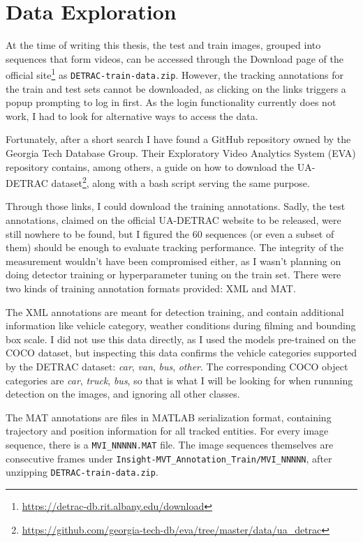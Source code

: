 \section{Data Exploration}

At the time of writing this thesis, the test and train images, grouped into sequences that form videos, can be accessed through the Download page of the official site\footnote{\url{https://detrac-db.rit.albany.edu/download}} as \verb|DETRAC-train-data.zip|. However, the tracking annotations for the train and test sets cannot be downloaded, as clicking on the links triggers a popup prompting to log in first. As the login functionality currently does not work, I had to look for alternative ways to access the data.  

Fortunately, after a short search I have found a GitHub repository owned by the Georgia Tech Database Group. Their Exploratory Video Analytics System (EVA) repository contains, among others, a guide on how to download the UA-DETRAC dataset\footnote{\url{https://github.com/georgia-tech-db/eva/tree/master/data/ua_detrac}}, along with a bash script serving the same purpose.

Through those links, I could download the training annotations. Sadly, the test annotations, claimed on the official UA-DETRAC website to be released, were still nowhere to be found, but I figured the 60 sequences (or even a subset of them) should be enough to evaluate tracking performance. The integrity of the measurement wouldn't have been compromised either, as I wasn't planning on doing detector training or hyperparameter tuning on the train set. There were two kinds of training annotation formats provided: XML and MAT.

The XML annotations are meant for detection training, and contain additional information like vehicle category, weather conditions during filming and bounding box scale. I did not use this data directly, as I used the models pre-trained on the COCO dataset, but inspecting this data confirms the vehicle categories supported by the DETRAC dataset: \textit{car}, \textit{van}, \textit{bus}, \textit{other}. The corresponding COCO object categories are \textit{car}, \textit{truck}, \textit{bus}, so that is what I will be looking for when runnning detection on the images, and ignoring all other classes.

The MAT annotations are files in MATLAB serialization format, containing trajectory and position information for all tracked entities. For every image sequence, there is a \verb|MVI_NNNNN.MAT| file.
The image sequences themselves are consecutive frames under \verb|Insight-MVT_Annotation_Train/MVI_NNNNN|, after unzipping \verb|DETRAC-train-data.zip|.

